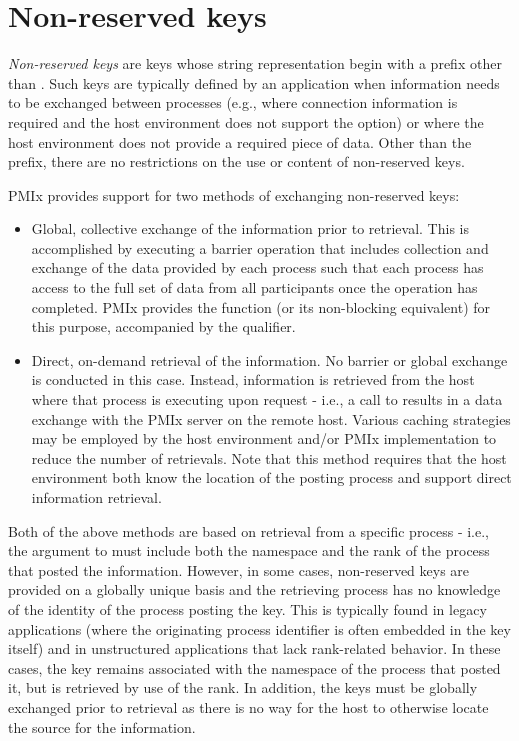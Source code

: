 \section{Non-reserved keys}
\label{chap:data_sharing:non_rsvd_keys}

\emph{Non-reserved keys} are keys whose string representation begin with a
prefix other than . Such keys are typically defined by an
application when information needs to be exchanged between processes (e.g.,
where connection information is required and the host environment does not
support the  option) or where the host environment does not
provide a required piece of data. Other than the prefix, there are no
restrictions on the use or content of non-reserved keys.

\ac{PMIx} provides support for two methods of exchanging non-reserved keys:

\begin{itemize}
    \item Global, collective exchange of the information prior to retrieval. This is accomplished by executing a barrier operation that includes collection and exchange of the data provided by each process such that each process has access to the full set of data from all participants once the operation has completed. \ac{PMIx} provides the  function (or its non-blocking equivalent) for this purpose, accompanied by the  qualifier.
    \item Direct, on-demand retrieval of the information. No barrier or global exchange is conducted in this case. Instead, information is retrieved from the host where that process is executing upon request - i.e., a call to  results in a data exchange with the \ac{PMIx} server on the remote host. Various caching strategies may be employed by the host environment and/or \ac{PMIx} implementation to reduce the number of retrievals. Note that this method requires that the host environment both know the location of the posting process and support direct information retrieval.
\end{itemize}

Both of the above methods are based on retrieval from a specific process -
i.e., the  argument to  must include both the
namespace and the rank of the process that posted the information. However, in
some cases, non-reserved keys are provided on a globally unique basis and the
retrieving process has no knowledge of the identity of the process posting the
key. This is typically found in legacy applications (where the originating
process identifier is often embedded in the key itself) and in unstructured
applications that lack rank-related behavior. In these cases, the key remains
associated with the namespace of the process that posted it, but is retrieved
by use of the  rank. In addition, the keys must be
globally exchanged prior to retrieval as there is no way for the host to
otherwise locate the source for the information.

